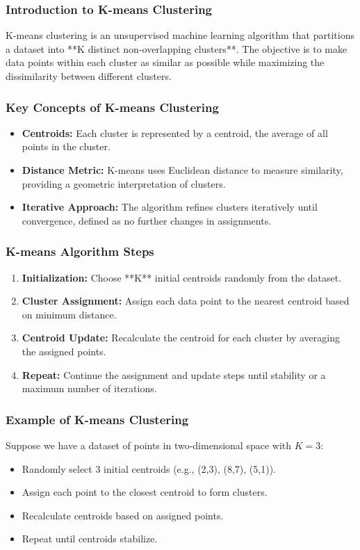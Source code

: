 \documentclass{beamer}
\begin{document}
\begin{frame}[fragile]
    \frametitle{Introduction to K-means Clustering}
    K-means clustering is an unsupervised machine learning algorithm that partitions a dataset into **K distinct non-overlapping clusters**. The objective is to make data points within each cluster as similar as possible while maximizing the dissimilarity between different clusters.
\end{frame}

\begin{frame}[fragile]
    \frametitle{Key Concepts of K-means Clustering}
    \begin{itemize}
        \item \textbf{Centroids:} Each cluster is represented by a centroid, the average of all points in the cluster.
        \item \textbf{Distance Metric:} K-means uses Euclidean distance to measure similarity, providing a geometric interpretation of clusters.
        \item \textbf{Iterative Approach:} The algorithm refines clusters iteratively until convergence, defined as no further changes in assignments.
    \end{itemize}
\end{frame}

\begin{frame}[fragile]
    \frametitle{K-means Algorithm Steps}
    \begin{enumerate}
        \item \textbf{Initialization:} Choose **K** initial centroids randomly from the dataset.
        \item \textbf{Cluster Assignment:} Assign each data point to the nearest centroid based on minimum distance.
        \item \textbf{Centroid Update:} Recalculate the centroid for each cluster by averaging the assigned points.
        \item \textbf{Repeat:} Continue the assignment and update steps until stability or a maximum number of iterations.
    \end{enumerate}
\end{frame}

\begin{frame}[fragile]
    \frametitle{Example of K-means Clustering}
    Suppose we have a dataset of points in two-dimensional space with \(K=3\):
    \begin{itemize}
        \item Randomly select 3 initial centroids (e.g., (2,3), (8,7), (5,1)).
        \item Assign each point to the closest centroid to form clusters.
        \item Recalculate centroids based on assigned points.
        \item Repeat until centroids stabilize.
    \end{itemize}
\end{frame}
\end{document}
